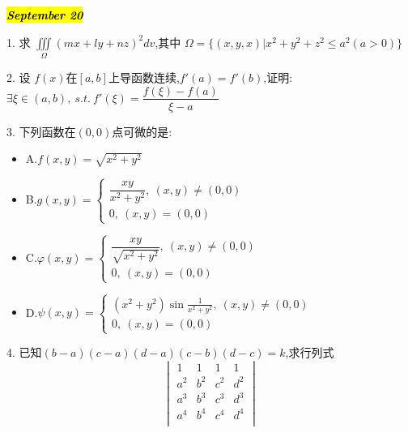 \hl{\textbf{\textit{September 20}}}

1. 求 $\iiint\limits_{\Omega}(mx+ly+nz)^2dv$,其中 $\Omega=\{(x,y,x)|x^2+y^2+z^2\leq a^2(a>0)\}$
\begin{solution}
	
\end{solution}

2. 设 $f(x)$在$[a,b]$上导函数连续,$f'(a)=f'(b)$,证明:  $\exists \xi\in(a,b),\ s.t.\ f'(\xi)=\dfrac{f(\xi)-f(a)}{\xi-a}$
\begin{solution}
	
\end{solution}

3. 下列函数在$(0,0)$点可微的是:
\begin{itemize}
	\item A.$f(x,y)=\sqrt{x^2+y^2}$
	\item B.$g(x,y)=\left\lbrace 
	\begin{array}{l}
		\dfrac{xy}{x^2+y^2},\ (x,y)\neq (0,0)\\
		0,\ (x,y)=(0,0)
	\end{array}
	\right. $
	\item C.$\varphi(x,y)=\left\lbrace 
	\begin{array}{l}
		\dfrac{xy}{\sqrt{x^2+y^2}},\ (x,y)\neq (0,0)\\
		0,\ (x,y)=(0,0)
	\end{array}
	\right. $
	\item D.$\psi(x,y)=\left\lbrace 
	\begin{array}{l}
		(x^2+y^2)\sin\frac{1}{x^2+y^2},\ (x,y)\neq (0,0)\\
		0,\ (x,y)=(0,0)
	\end{array}
	\right. $
\end{itemize}
\begin{solution}
	
\end{solution}

4. 已知$(b-a)(c-a)(d-a)(c-b)(d-c)=k$,求行列式
$$\begin{vmatrix}
	1&1&1&1\\
	a^2&b^2&c^2&d^2\\
	a^3&b^3&c^3&d^3\\
	a^4&b^4&c^4&d^4\\
\end{vmatrix}$$
\begin{solution}
	
\end{solution}

